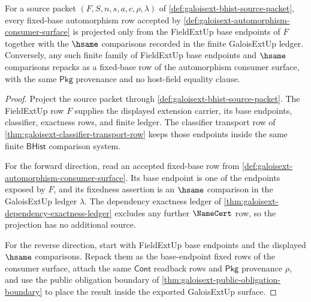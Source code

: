 \begin{theorem}
\label{thm:galoisext-fixed-base-automorphism-source}
For a source packet $(F,S,n,s,a,c,\rho,\lambda)$ of
\autoref{def:galoisext-bhist-source-packet}, every fixed-base automorphism row
accepted by
\autoref{def:galoisext-automorphism-consumer-surface} is projected only from
the FieldExtUp base endpoints of $F$ together with the $\hsame$ comparisons
recorded in the finite GaloisExtUp ledger. Conversely, any such finite family
of FieldExtUp base endpoints and $\hsame$ comparisons repacks as a fixed-base
row of the automorphism consumer surface, with the same $\mathsf{Pkg}$
provenance and no host-field equality clause.
\end{theorem}
\begin{proof}
Project the source packet through
\autoref{def:galoisext-bhist-source-packet}. The FieldExtUp row $F$ supplies
the displayed extension carrier, its base endpoints, classifier, exactness
rows, and finite ledger. The classifier transport row of
\autoref{thm:galoisext-classifier-transport-row} keeps those endpoints inside
the same finite $\mathsf{BHist}$ comparison system.

For the forward direction, read an accepted fixed-base row from
\autoref{def:galoisext-automorphism-consumer-surface}. Its base endpoint is
one of the endpoints exposed by $F$, and its fixedness assertion is an
$\hsame$ comparison in the GaloisExtUp ledger $\lambda$. The dependency
exactness ledger of \autoref{thm:galoisext-dependency-exactness-ledger}
excludes any further $\NameCert$ row, so the projection has no additional
source.

For the reverse direction, start with FieldExtUp base endpoints and the
displayed $\hsame$ comparisons. Repack them as the base-endpoint fixed rows of
the consumer surface, attach the same $\mathsf{Cont}$ readback rows and
$\mathsf{Pkg}$ provenance $\rho$, and use the public obligation boundary of
\autoref{thm:galoisext-public-obligation-boundary} to place the result inside
the exported GaloisExtUp surface.
\end{proof}

